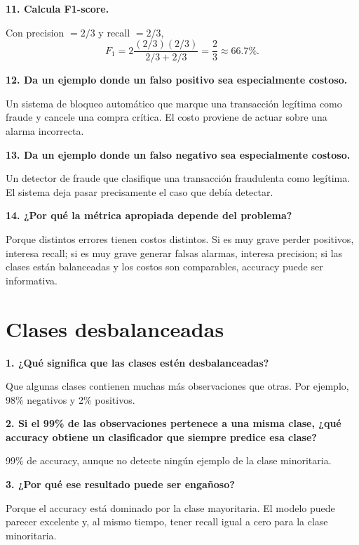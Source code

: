 \documentclass[11pt]{article}
\newcommand{\pregunta}[1]{\vspace{2mm}\textbf{#1}}
\begin{document}
\pregunta{11. Calcula F1-score.}
\begin{respuesta}
Con precision $=2/3$ y recall $=2/3$,
\[
F_1=2\frac{(2/3)(2/3)}{2/3+2/3}=\frac23\approx66.7\%.
\]
\end{respuesta}

\pregunta{12. Da un ejemplo donde un falso positivo sea especialmente costoso.}
\begin{respuesta}
Un sistema de bloqueo automático que marque una transacción legítima como fraude y cancele una compra crítica. El costo proviene de actuar sobre una alarma incorrecta.
\end{respuesta}

\pregunta{13. Da un ejemplo donde un falso negativo sea especialmente costoso.}
\begin{respuesta}
Un detector de fraude que clasifique una transacción fraudulenta como legítima. El sistema deja pasar precisamente el caso que debía detectar.
\end{respuesta}

\pregunta{14. ¿Por qué la métrica apropiada depende del problema?}
\begin{respuesta}
Porque distintos errores tienen costos distintos. Si es muy grave perder positivos, interesa recall; si es muy grave generar falsas alarmas, interesa precision; si las clases están balanceadas y los costos son comparables, accuracy puede ser informativa.
\end{respuesta}

\section{Clases desbalanceadas}

\pregunta{1. ¿Qué significa que las clases estén desbalanceadas?}
\begin{respuesta}
Que algunas clases contienen muchas más observaciones que otras. Por ejemplo, 98\% negativos y 2\% positivos.
\end{respuesta}

\pregunta{2. Si el 99\% de las observaciones pertenece a una misma clase, ¿qué accuracy obtiene un clasificador que siempre predice esa clase?}
\begin{respuesta}
99\% de accuracy, aunque no detecte ningún ejemplo de la clase minoritaria.
\end{respuesta}

\pregunta{3. ¿Por qué ese resultado puede ser engañoso?}
\begin{respuesta}
Porque el accuracy está dominado por la clase mayoritaria. El modelo puede parecer excelente y, al mismo tiempo, tener recall igual a cero para la clase minoritaria.
\end{respuesta}
\end{document}
